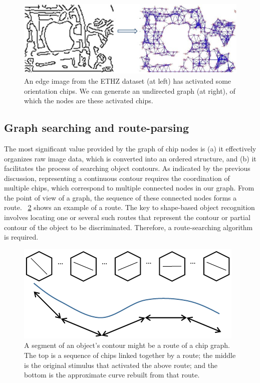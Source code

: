 \documentclass[journal]{IEEEtran}
\begin{document}
\begin{figure}[!t]
\centering
\includegraphics[width=0.85\linewidth]{images/fig8.jpg}
\caption{An edge image from the ETHZ dataset (at left) has activated some orientation chips. 
We can generate an undirected graph (at right), of which the nodes are these activated chips.}
\label{fig:8}
\end{figure}

\subsection{Graph searching and route-parsing}

The most significant value provided by the graph of chip nodes is 
(a) it effectively organizes raw image data, which is converted into an ordered structure, 
and (b) it facilitates the process of searching object contours. 
As indicated by the previous discussion, 
representing a continuous contour requires the coordination of multiple chips, 
which correspond to multiple connected nodes in our graph.
From the point of view of a graph, the sequence of these connected nodes forms a route.
\figurename~\ref{fig:9} shows an example of a route. 
The key to shape-based object recognition involves locating one or several such routes
that represent the contour or partial contour of the object to be discriminated.
Therefore, a route-searching algorithm is required.

\begin{figure}[!t]
\centering
\includegraphics[width=0.5\linewidth]{images/fig9.pdf}
\caption{A segment of an object's contour might be a route of a chip graph. 
The top is a sequence of chips linked together by a route; 
the middle is the original stimulus that activated the above route; 
and the bottom is the approximate curve rebuilt from that route. }
\label{fig:9}
\end{figure}
\end{document}
